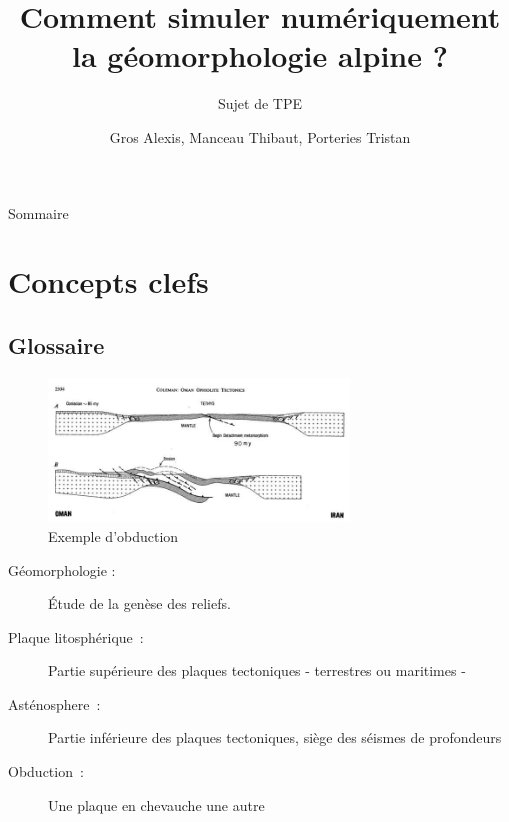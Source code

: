 \documentclass{beamer}
\title{Comment simuler numériquement la géomorphologie alpine ?}
\subtitle{Sujet de TPE}
\author{Gros Alexis, Manceau Thibaut, Porteries Tristan}
\begin{document}
\frame{\titlepage}
\begin{frame}{Sommaire}
  \begin{multicols}{2}
    \small \tableofcontents
  \end{multicols}
\end{frame}

\section{Concepts clefs}

\subsection{Glossaire}
\begin{frame}
 \begin{center}
	\begin{figure}
	 \includegraphics[width=8cm]{Images/Images_Alexis/image007.jpg}
	 \caption{Exemple d'obduction}
	\end{figure}
		\begin{description}
		 \item[Géomorphologie :] Étude de la genèse des reliefs.
		 \item[Plaque litosphérique :] Partie supérieure des plaques tectoniques - terrestres ou maritimes -
		 \item[Asténosphere :] Partie inférieure des plaques tectoniques, siège des séismes de profondeurs
		 \item[Obduction :] Une plaque en chevauche une autre
		\end{description}
 \end{center}
\end{frame}
 
\end{document}
